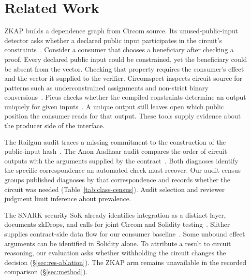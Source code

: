 \section{Related Work}\label{sec:related}

ZKAP builds a dependence graph from Circom source. Its unused-public-input
detector asks whether a declared public input participates in the circuit's
constraints~\cite{zkap}. Consider a consumer that chooses a beneficiary after
checking a proof. Every declared public input could be constrained, yet the
beneficiary could be absent from the vector. Checking that property requires
the consumer's effect and the vector it supplied to the verifier.
Circomspect inspects circuit source for patterns such as underconstrained
assignments and non-strict binary conversions~\cite{circomspect}. Picus
checks whether the compiled constraints determine an output uniquely for
given inputs~\cite{picus}. A unique output still leaves open which public
position the consumer reads for that output. These tools supply evidence
about the producer side of the interface.

The Railgun audit traces a missing commitment to the construction of the
public-input hash~\cite{abdk-railgun}. The Anon Aadhaar audit compares the
order of circuit outputs with the arguments supplied by the
contract~\cite{pse-anonaadhaar}. Both diagnoses identify the specific
correspondence an automated check must recover. Our audit census groups
published diagnoses by that correspondence and records whether the circuit
was needed (Table~\ref{tab:class-census}). Audit selection and reviewer
judgment limit inference about prevalence.

The SNARK security SoK already identifies integration as a distinct layer,
documents zkDrops, and calls for joint Circom and Solidity
testing~\cite{sok-snarks}. Slither supplies contract-side data flow for our
consumer baseline~\cite{slither}. Some unbound effect arguments can be
identified in Solidity alone. To attribute a result to circuit reasoning,
our evaluation asks whether withholding the circuit changes the decision
(\S\ref{sec:res-ablation}). The ZKAP arm remains unavailable in the recorded
comparison (\S\ref{sec:method}).
